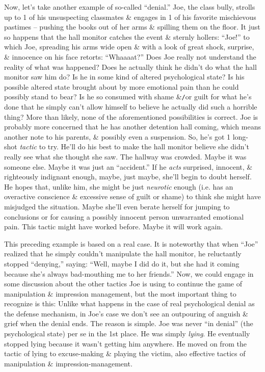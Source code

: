 \documentclass{article}
\numberwithin{equation}{section}
\begin{document}
Now, let's take another example of so-called ``denial.'' Joe, the class bully, strolls up to 1 of his unsuspecting classmates \& engages in 1 of his favorite mischievous pastimes -- pushing the books out of her arms \& spilling them on the floor. It just so happens that the hall monitor catches the event \& sternly hollers: ``Joe!'' to which Joe, spreading his arms wide open \& with a look of great shock, surprise, \& innocence on his face retorts: ``Whaaaat?'' Does Joe really not understand the reality of what was happened? Does he actually think he didn't do what the hall monitor saw him do? Is he in some kind of altered psychological state? Is his possible altered state brought about by more emotional pain than he could possibly stand to bear? Is he so consumed with shame \&\texttt{/}or guilt for what he's done that he simply can't allow himself to believe he actually did such a horrible thing? More than likely, none of the aforementioned possibilities is correct. Joe is probably more concerned that he has another detention hall coming, which means another note to his parents, \& possibly even a suspension. So, he's got 1 long-shot \textit{tactic} to try. He'll do his best to make the hall monitor believe she didn't really see what she thought she saw. The hallway was crowded. Maybe it was someone else. Maybe it was just an ``accident.'' If he \textit{acts} surprised, innocent, \& righteously indignant enough, maybe, just maybe, she'll begin to doubt herself. He hopes that, unlike him, she might be just \textit{neurotic} enough (i.e. has an overactive conscience \& excessive sense of guilt or shame) to think she might have misjudged the situation. Maybe she'll even berate herself for jumping to conclusions or for causing a possibly innocent person unwarranted emotional pain. This tactic might have worked before. Maybe it will work again.

This preceding example is based on a real case. It is noteworthy that when ``Joe'' realized that he simply couldn't manipulate the hall monitor, he reluctantly stopped ``denying,'' saying: ``Well, maybe I did do it, but she had it coming because she's always bad-mouthing me to her friends.'' Now, we could engage in some discussion about the other tactics Joe is using to continue the game of manipulation \& impression management, but the most important thing to recognize is this: Unlike what happens in the case of real psychological denial as the defense mechanism, in Joe's case we don't see an outpouring of anguish \& grief when the denial ends. The reason is simple. Joe was never ``in denial'' (the psychological state) per se in the 1st place. He was simply \textit{lying}. He eventually stopped lying because it wasn't getting him anywhere. He moved on from the tactic of lying to excuse-making \& playing the victim, also effective tactics of manipulation \& impression-management.
\end{document}
